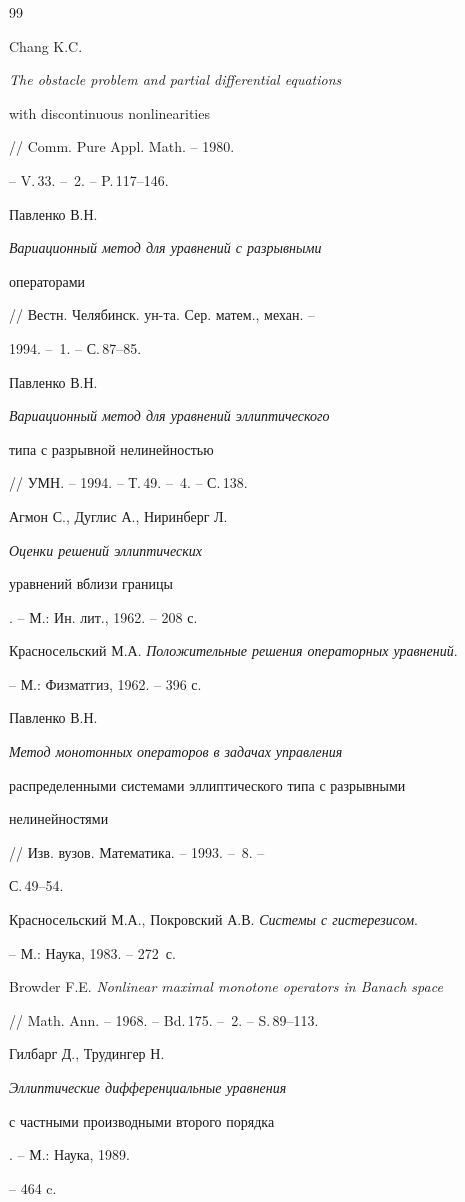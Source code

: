 \begin{thebibliography}{99}


Chang K.C. {\em The obstacle problem and partial differential equations 


with discontinuous nonlinearities} // Comm. Pure Appl. Math. -- 1980. 


-- V.\,33. -- \No\,2. -- P.\,117--146. 




Павленко В.Н. {\em Вариационный метод для уравнений с разрывными 


операторами} // Вестн. Челябинск. ун-та. Сер. матем., механ. -- 


1994. -- \No\,1. -- С.\,87--85. 




Павленко В.Н. {\em Вариационный метод для уравнений эллиптического 


типа с разрывной нелинейностью} 


// УМН. -- 1994. -- Т.\,49. -- \No\,4. -- С.\,138. 




Агмон С., Дуглис А., Ниринберг Л. {\em Оценки решений эллиптических 


уравнений вблизи границы}. -- М.: Ин. лит., 1962. -- 208 с. 




Красносельский М.А. {\em Положительные решения операторных уравнений}. 


-- М.: Физматгиз, 1962. -- 396 с. 




Павленко В.Н. {\em Метод монотонных операторов в задачах управления 


распределенными системами эллиптического типа с разрывными 


нелинейностями} // Изв. вузов. Математика. -- 1993. -- \No\,8. -- 


С.\,49--54. 




Красносельский М.А., Покровский А.В. {\em Системы с гистерезисом}. 


-- М.: Наука, 1983. -- 272~с. 




Browder F.E. {\em Nonlinear maximal monotone operators in Banach space} 


// Math. Ann. -- 1968. -- Bd.\,175. -- \No\,2. -- S.\,89--113. 




Гилбарг Д., Трудингер Н. {\em Эллиптические дифференциальные уравнения 


с частными производными второго порядка}. -- М.: Наука, 1989. 


-- 464 c.


 


\end{thebibliography} 


